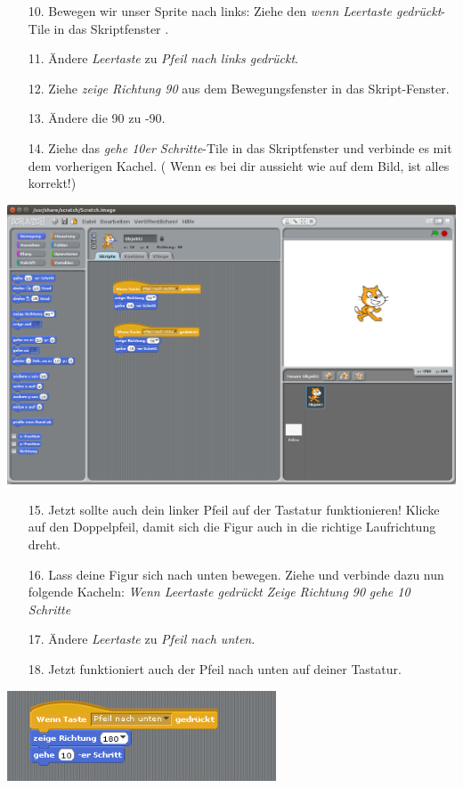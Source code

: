 \begin{itemize}

\item[10.] Bewegen wir unser Sprite nach links: Ziehe den \textit{wenn Leertaste gedrückt}-Tile in das Skriptfenster .
\item[11.] Ändere \textit{Leertaste} zu \textit{Pfeil nach links gedrückt}.
\item[12.] Ziehe \textit{zeige Richtung 90} aus dem Bewegungsfenster in das Skript-Fenster.
\item[13.] Ändere die 90 zu -90.
\item[14.] Ziehe das \textit{gehe 10er Schritte}-Tile in das Skriptfenster und verbinde es mit dem vorherigen Kachel.
( Wenn es bei dir aussieht wie auf dem Bild, ist alles korrekt!)
\end{itemize}
\includegraphics[width=\textwidth]{images/aufgabe1_links.png}

\begin{itemize}
\item[15.] Jetzt sollte auch dein linker Pfeil auf der Tastatur funktionieren! Klicke auf den Doppelpfeil, damit sich die Figur auch in die richtige Laufrichtung dreht. 
\item[16.] Lass deine Figur sich nach unten bewegen. Ziehe und verbinde dazu nun folgende Kacheln:
\subitem \textit{Wenn Leertaste gedrückt}
\subitem \textit{Zeige Richtung 90}
\subitem \textit{gehe 10 Schritte}
\item[17.] Ändere \textit{Leertaste} zu \textit{Pfeil nach unten}.
\item[18.] Jetzt funktioniert auch der Pfeil nach unten auf deiner Tastatur. 
\end{itemize}
\includegraphics[width=0.6\textwidth]{images/aufgabe1_unten.png}

